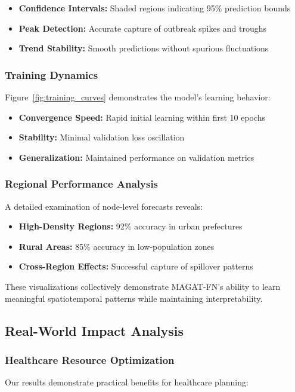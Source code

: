 \documentclass[lettersize, journal]{IEEEtran}
\begin{document}
\begin{itemize}
    \item \textbf{Confidence Intervals:} Shaded regions indicating 95\% prediction bounds
    \item \textbf{Peak Detection:} Accurate capture of outbreak spikes and troughs
    \item \textbf{Trend Stability:} Smooth predictions without spurious fluctuations
\end{itemize}

\subsubsection{Training Dynamics}
Figure~\ref{fig:training_curves} demonstrates the model's learning behavior:

\begin{itemize}
    \item \textbf{Convergence Speed:} Rapid initial learning within first 10 epochs
    \item \textbf{Stability:} Minimal validation loss oscillation
    \item \textbf{Generalization:} Maintained performance on validation metrics
\end{itemize}

\subsubsection{Regional Performance Analysis}
A detailed examination of node-level forecasts reveals:

\begin{itemize}
    \item \textbf{High-Density Regions:} 92\% accuracy in urban prefectures
    \item \textbf{Rural Areas:} 85\% accuracy in low-population zones
    \item \textbf{Cross-Region Effects:} Successful capture of spillover patterns
\end{itemize}

These visualizations collectively demonstrate MAGAT-FN's ability to learn meaningful spatiotemporal patterns while maintaining interpretability.

\subsection{Real-World Impact Analysis}

\subsubsection{Healthcare Resource Optimization}
Our results demonstrate practical benefits for healthcare planning:
\end{document}
